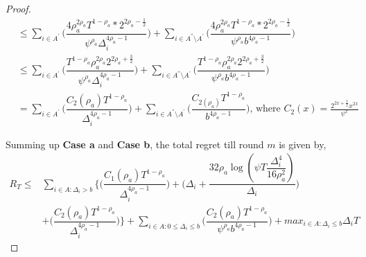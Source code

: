 \begin{proof}
\begin{align*}
&\leq\sum_{i\in A^{'}}\bigg(\dfrac{4\rho_{a}^{2\rho_{a}}T^{1-\rho_{a}}*2^{2\rho_{a}-\frac{1}{2}}}{\psi^{\rho_{a}}\Delta_{i}^{4\rho_{a}-1}} \bigg)+\sum_{i\in A^{''}\setminus A^{'}}\bigg(\dfrac{4\rho_{a}^{2\rho_{a}}T^{1-\rho_{a}}*2^{2\rho_{a}-\frac{1}{2}}}{\psi^{\rho_{a}}b^{4\rho_{a}-1}} \bigg)\\
&\leq\sum_{i\in A^{'}}\bigg(\dfrac{T^{1-\rho_{a}}\rho_{a}^{2\rho_{a}}2^{2\rho_{a}+\frac{3}{2}}}{\psi^{\rho_{a}}\Delta_{i}^{4\rho_{a}-1}} \bigg)+\sum_{i\in A^{''}\setminus A^{'}}\bigg(\dfrac{T^{1-\rho_{a}}\rho_{a}^{2\rho_{a}}2^{2\rho_{a}+\frac{3}{2}}}{\psi^{\rho_{a}}b^{4\rho_{a}-1}} \bigg)\\
& = \sum_{i\in A^{'}}\bigg(\dfrac{ C_{2}(\rho_{a}) T^{1-\rho_{a}}}{\Delta_{i}^{4\rho_{a}-1}} \bigg)+\sum_{i\in A^{''}\setminus A^{'}}\bigg(\dfrac{C_{2(\rho_{a})}T^{1-\rho_{a}}}{b^{4\rho_{a}-1}} \bigg) \text{, where } C_2(x) = \frac{2^{2x+\frac{3}{2}}x^{2x}}{\psi^{x}}
\end{align*}


 
Summing up \textbf{Case a} and \textbf{Case b}, the total regret till round $m$ is given by,
\begin{align*}
 R_{T} \leq &\sum\limits_{i\in A:\Delta_{i} > b}\bigg\lbrace\bigg(\dfrac{C_{1}(\rho_{a})T^{1-\rho_{a}}}{\Delta_{i}^{4\rho_{a}-1}}\bigg) + \bigg(\Delta_{i}+\dfrac{32\rho_{a}\log{(\psi  T\dfrac{\Delta_{i}^{4}}{16\rho_{a}^{2}})}}{\Delta_{i}}\bigg)\\
&  +  \bigg(\dfrac{C_{2}(\rho_{a})T^{1-\rho_{a}}}{\Delta_{i}^{4\rho_{a} -1}} \bigg) \bigg \rbrace+\sum\limits_{i\in A:0\leq\Delta_{i}\leq b}\bigg(\dfrac{C_{2}(\rho_{a})T^{1-\rho_{a}}}{\psi^{\rho_{a}}b^{4\rho_{a} -1}} \bigg) + max_{i\in A:\Delta_{i}\leq b}\Delta_{i}T
\end{align*}

  
\end{proof}


